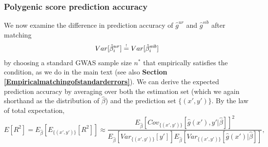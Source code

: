 \documentclass[hidelinks, 12pt]{article}
\begin{document}
\subsubsection{Polygenic score prediction accuracy}
\label{polygenic_score_prediction_accuracy}
We now examine the difference in prediction accuracy of $\hat{g}^{ur}$ and $\hat{g}^{sib}$ after matching 
\begin{equation}
\label{matching_errors_indirect}
Var[\hat{\beta}_i^{ur}] \reqeq Var[\hat{\beta}_i^{sib}]
\end{equation}
by choosing a standard GWAS sample size $n^*$ that empirically satisfies the condition, as we do in the main text (see also {\bf Section \ref{Empiricalmatchingofstandarderrors}}).  
We can derive the expected prediction accuracy by averaging over both the estimation set (which we again shorthand as the distribution of $\hat{\beta}$) and the prediction set $\{(x',y')\}$.  By the law of total expectation,
\begin{equation}
\label{total_expectation_for_R2}
E[R^2] = E_{\hat{\beta}}[E_{\{(x',y')\}}[R^2]] \approx 
\frac{E_{\hat{\beta}}[Cov_{\{(x',y')\}}[\hat{g}(x'),y'|\hat{\beta}]]^2}{E_{\hat{\beta}}[Var_{\{(x',y')\}}[y']]E_{\hat{\beta}}[Var_{\{(x',y')\}}[\hat{g}(x')|\hat{\beta}]]},
\end{equation}
\end{document}
